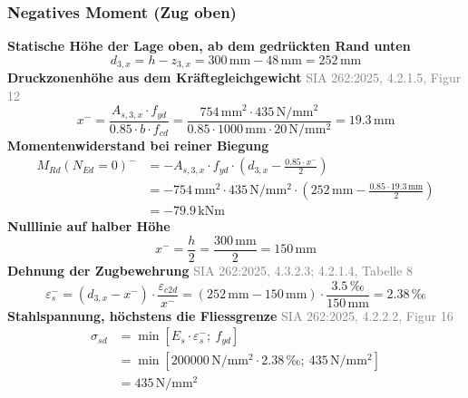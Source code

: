 \documentclass[11pt,a4paper]{article}
\newcommand{\normref}[1]{{\small\textcolor{gray}{#1}}}
\begin{document}
\subsubsection{Negatives Moment (Zug oben)}
\noindent\textbf{Statische Höhe der Lage oben, ab dem gedrückten Rand unten}
\begin{equation*}
d_{3,x} = h - z_{3,x} = 300\,\mathrm{mm} - 48\,\mathrm{mm} = 252\,\mathrm{mm}
\end{equation*}
\noindent\textbf{Druckzonenhöhe aus dem Kräftegleichgewicht} \hfill \normref{SIA 262:2025, 4.2.1.5, Figur 12}
\begin{equation*}
x^{-} = \frac{A_{s,3,x} \cdot f_{yd}}{0.85 \cdot b \cdot f_{cd}} = \frac{754\,\mathrm{mm}^{2} \cdot 435\,\mathrm{N}/\mathrm{mm}^{2}}{0.85 \cdot 1000\,\mathrm{mm} \cdot 20\,\mathrm{N}/\mathrm{mm}^{2}} = 19.3\,\mathrm{mm}
\end{equation*}
\noindent\textbf{Momentenwiderstand bei reiner Biegung}
\begin{equation*}
\begin{aligned}
  M_{Rd}(N_{Ed}=0)^{-} &= -A_{s,3,x} \cdot f_{yd} \cdot \left(d_{3,x} - \frac{0.85 \cdot x^{-}}{2}\right) \\
  &= -754\,\mathrm{mm}^{2} \cdot 435\,\mathrm{N}/\mathrm{mm}^{2} \cdot \left(252\,\mathrm{mm} - \frac{0.85 \cdot 19.3\,\mathrm{mm}}{2}\right) \\
  &= -79.9\,\mathrm{kNm}
\end{aligned}
\end{equation*}
\noindent\textbf{Nulllinie auf halber Höhe}
\begin{equation*}
x^{-} = \frac{h}{2} = \frac{300\,\mathrm{mm}}{2} = 150\,\mathrm{mm}
\end{equation*}
\noindent\textbf{Dehnung der Zugbewehrung} \hfill \normref{SIA 262:2025, 4.3.2.3; 4.2.1.4, Tabelle 8}
\begin{equation*}
\varepsilon_s^{-} = \left(d_{3,x} - x^{-}\right) \cdot \frac{\varepsilon_{c2d}}{x^{-}} = \left(252\,\mathrm{mm} - 150\,\mathrm{mm}\right) \cdot \frac{3.5\,\text{‰}}{150\,\mathrm{mm}} = 2.38\,\text{‰}
\end{equation*}
\noindent\textbf{Stahlspannung, höchstens die Fliessgrenze} \hfill \normref{SIA 262:2025, 4.2.2.2, Figur 16}
\begin{equation*}
\begin{aligned}
  \sigma_{sd} &= \min\left[E_s \cdot \varepsilon_s^{-};\ f_{yd}\right] \\
  &= \min\left[200000\,\mathrm{N}/\mathrm{mm}^{2} \cdot 2.38\,\text{‰};\ 435\,\mathrm{N}/\mathrm{mm}^{2}\right] \\
  &= 435\,\mathrm{N}/\mathrm{mm}^{2}
\end{aligned}
\end{equation*}
\end{document}
